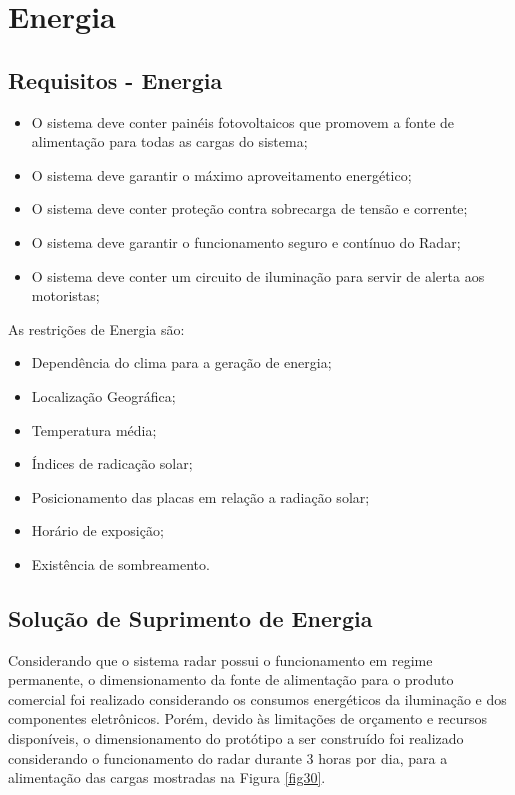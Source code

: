 \chapter{Energia}
\section{Requisitos - Energia}
\begin{itemize}
    \item O sistema deve conter painéis fotovoltaicos que promovem a fonte de alimentação para todas as cargas do sistema;
\item O sistema deve garantir o máximo aproveitamento energético;
\item O sistema deve conter proteção contra sobrecarga de tensão e corrente;
\item O sistema deve garantir o funcionamento seguro e contínuo do Radar;
\item O sistema deve conter um circuito de iluminação para servir de alerta aos motoristas;
\end{itemize}


As restrições de Energia são:
\begin{itemize}
\item Dependência do clima para a geração de energia;
\item Localização Geográfica;
\item Temperatura média;
\item Índices de radicação solar;
\item Posicionamento das placas em relação a radiação solar;
\item Horário de exposição;
\item Existência de sombreamento. 
\end{itemize}


\section{Solução de Suprimento de Energia}

Considerando que o sistema radar possui o funcionamento em regime permanente, o dimensionamento da fonte de alimentação para o produto comercial foi realizado considerando os consumos energéticos da iluminação e dos componentes eletrônicos. Porém, devido às limitações de orçamento e recursos disponíveis, o dimensionamento do protótipo a ser construído foi realizado considerando o funcionamento do radar durante 3 horas por dia, para a alimentação das cargas mostradas na Figura \ref{fig30}.


